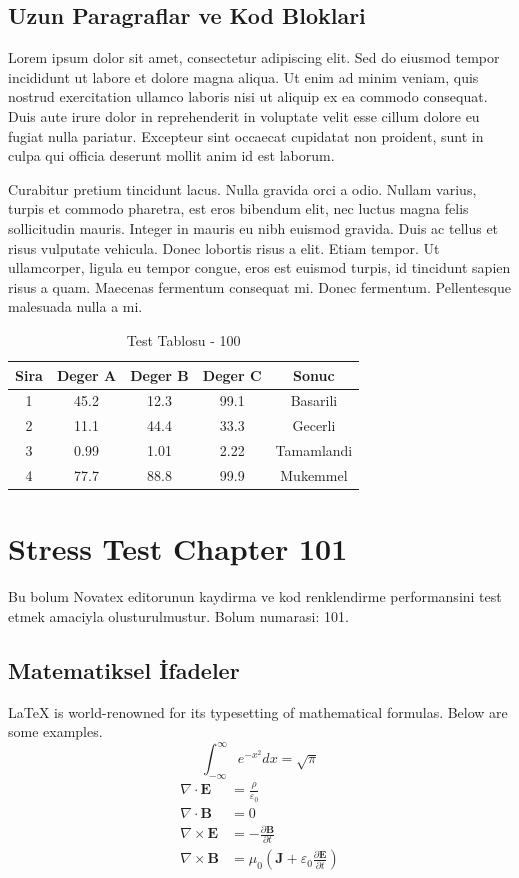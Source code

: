 \documentclass[12pt,a4paper]{article}
\begin{document}
\subsection{Uzun Paragraflar ve Kod Bloklari}
Lorem ipsum dolor sit amet, consectetur adipiscing elit. Sed do eiusmod tempor incididunt ut labore et dolore magna aliqua. Ut enim ad minim veniam, quis nostrud exercitation ullamco laboris nisi ut aliquip ex ea commodo consequat. Duis aute irure dolor in reprehenderit in voluptate velit esse cillum dolore eu fugiat nulla pariatur. Excepteur sint occaecat cupidatat non proident, sunt in culpa qui officia deserunt mollit anim id est laborum.

Curabitur pretium tincidunt lacus. Nulla gravida orci a odio. Nullam varius, turpis et commodo pharetra, est eros bibendum elit, nec luctus magna felis sollicitudin mauris. Integer in mauris eu nibh euismod gravida. Duis ac tellus et risus vulputate vehicula. Donec lobortis risus a elit. Etiam tempor. Ut ullamcorper, ligula eu tempor congue, eros est euismod turpis, id tincidunt sapien risus a quam. Maecenas fermentum consequat mi. Donec fermentum. Pellentesque malesuada nulla a mi.

\begin{table}[h!]
\centering
\begin{tabular}{|c|c|c|c|c|}
\hline
\textbf{Sira} & \textbf{Deger A} & \textbf{Deger B} & \textbf{Deger C} & \textbf{Sonuc} \\
\hline
1 & 45.2 & 12.3 & 99.1 & Basarili \\
2 & 11.1 & 44.4 & 33.3 & Gecerli \\
3 & 0.99 & 1.01 & 2.22 & Tamamlandi \\
4 & 77.7 & 88.8 & 99.9 & Mukemmel \\
\hline
\end{tabular}
\caption{Test Tablosu - 100}
\end{table}

\newpage
\section{Stress Test Chapter 101}
Bu bolum Novatex editorunun kaydirma ve kod renklendirme performansini test etmek amaciyla olusturulmustur. Bolum numarasi: 101.

\subsection{Matematiksel İfadeler}
\LaTeX{} is world-renowned for its typesetting of mathematical formulas. Below are some examples.
\begin{equation}
\int_{-\infty}^{\infty} e^{-x^2} dx = \sqrt{\pi}
\end{equation}
\begin{align}
\nabla \cdot \mathbf{E} &= \frac{\rho}{\varepsilon_0} \\
\nabla \cdot \mathbf{B} &= 0 \\
\nabla \times \mathbf{E} &= -\frac{\partial \mathbf{B}}{\partial t} \\
\nabla \times \mathbf{B} &= \mu_0\left(\mathbf{J} + \varepsilon_0 \frac{\partial \mathbf{E}}{\partial t}\right)
\end{align}
\end{document}

